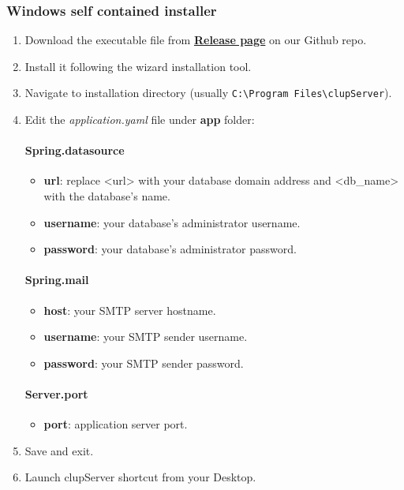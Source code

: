 \documentclass[table, 12pt]{article}
\begin{document}
\subsubsection{Windows self contained installer}
\begin{enumerate}
    \item Download the executable file from \textbf{\href{https://github.com/PiroX4256/SE2-Piemonti-Pirovano-Sonnino/releases}{Release page}} on our Github repo.
    \item Install it following the wizard installation tool.
    \item Navigate to installation directory (usually \texttt{C:\textbackslash{}Program Files\textbackslash{}clupServer}).
    \item Edit the \textit{application.yaml} file under \textbf{app} folder:\\
     \paragraph{Spring.datasource}
    \begin{itemize}
        \item \textbf{url}: replace <url> with your database domain address and \textless{}db\_name\textgreater{} with the database's name.
        \item \textbf{username}: your database's administrator username.
        \item \textbf{password}: your database's administrator password.
    \end{itemize}
    \paragraph{Spring.mail}
    \begin{itemize}
        \item \textbf{host}: your SMTP server hostname.
        \item \textbf{username}: your SMTP sender username.
        \item \textbf{password}: your SMTP sender password.
    \end{itemize}
    \paragraph{Server.port}
    \begin{itemize}
        \item \textbf{port}: application server port.
    \end{itemize}
    \item Save and exit.
    \item Launch clupServer shortcut from your Desktop.
\end{enumerate}
\end{document}
